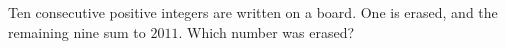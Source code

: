 Ten consecutive positive integers are written on a board. One is erased, and the remaining nine sum to $2011$. Which number was erased?
